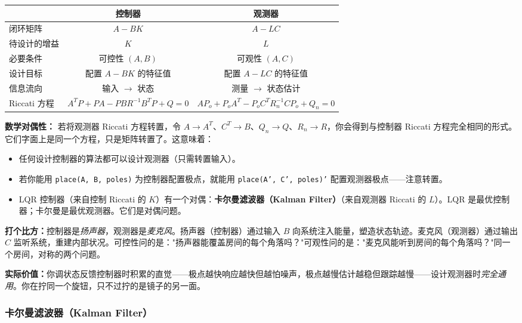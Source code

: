 \begin{center}
\begin{tabular}{lcc}
\toprule
 & \textbf{控制器} & \textbf{观测器} \\
\midrule
闭环矩阵 & $A - BK$ & $A - LC$ \\
待设计的增益 & $K$ & $L$ \\
必要条件 & 可控性 $(A, B)$ & 可观性 $(A, C)$ \\
设计目标 & 配置 $A - BK$ 的特征值 & 配置 $A - LC$ 的特征值 \\
信息流向 & 输入 $\to$ 状态 & 测量 $\to$ 状态估计 \\
Riccati 方程 & $A^TP + PA - PBR^{-1}B^TP + Q = 0$ & $AP_o + P_oA^T - P_oC^TR_n^{-1}CP_o + Q_n = 0$ \\
\bottomrule
\end{tabular}
\end{center}

\textbf{数学对偶性：} 若将观测器 Riccati 方程转置，令 $A \to A^T$、$C^T \to B$、$Q_n \to Q$、$R_n \to R$，你会得到与控制器 Riccati 方程完全相同的形式。它们字面上是同一个方程，只是矩阵转置了。这意味着：

\begin{itemize}
    \item 任何设计控制器的算法都可以设计观测器（只需转置输入）。
    \item 若你能用 \texttt{place(A, B, poles)} 为控制器配置极点，就能用 \texttt{place(A', C', poles)'} 配置观测器极点——注意转置。
    \item LQR 控制器（来自控制 Riccati 的 $K$）有一个对偶：\textbf{卡尔曼滤波器（Kalman Filter）}（来自观测器 Riccati 的 $L$）。LQR 是最优控制器；卡尔曼是最优观测器。它们是对偶问题。
\end{itemize}

\textbf{打个比方：}控制器是\textit{扬声器}，观测器是\textit{麦克风}。扬声器（控制器）通过输入 $B$ 向系统注入能量，塑造状态轨迹。麦克风（观测器）通过输出 $C$ 监听系统，重建内部状况。可控性问的是："扬声器能覆盖房间的每个角落吗？"可观性问的是："麦克风能听到房间的每个角落吗？"同一个房间，对称的两个问题。

\textbf{实际价值：}你调状态反馈控制器时积累的直觉——极点越快响应越快但越怕噪声，极点越慢估计越稳但跟踪越慢——设计观测器时\textit{完全通用}。你在拧同一个旋钮，只不过拧的是镜子的另一面。

\subsubsection{卡尔曼滤波器（Kalman Filter）}

